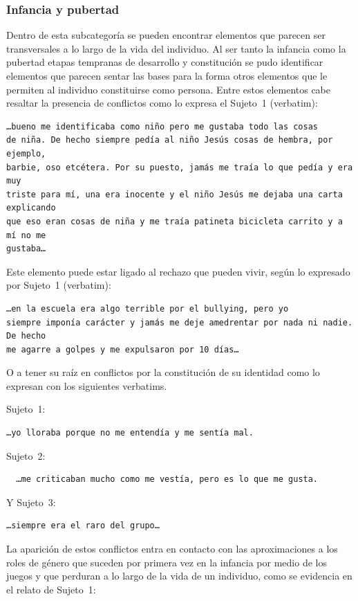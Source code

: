 \subsubsection{Infancia y pubertad}
Dentro de esta subcategoría se pueden
encontrar elementos que parecen ser transversales a lo largo de la vida del
individuo. Al ser tanto la infancia como la pubertad etapas tempranas de
desarrollo y constitución se pudo identificar elementos que parecen sentar las
bases para la forma otros elementos que le permiten al individuo constituirse
como persona. Entre estos elementos cabe resaltar la presencia de conflictos
como lo expresa el Sujeto~1 (verbatim):

\begin{verbatim}
…bueno me identificaba como niño pero me gustaba todo las cosas
de niña. De hecho siempre pedía al niño Jesús cosas de hembra, por ejemplo,
barbie, oso etcétera. Por su puesto, jamás me traía lo que pedía y era muy
triste para mí, una era inocente y el niño Jesús me dejaba una carta explicando
que eso eran cosas de niña y me traía patineta bicicleta carrito y a mí no me
gustaba…
\end{verbatim}

Este elemento puede estar ligado al rechazo que pueden vivir, según lo expresado
por Sujeto~1 (verbatim):

\begin{verbatim}
…en la escuela era algo terrible por el bullying, pero yo
siempre imponía carácter y jamás me deje amedrentar por nada ni nadie. De hecho
me agarre a golpes y me expulsaron por 10 días…
\end{verbatim}

O a tener su raíz en conflictos por la constitución de su identidad como lo
expresan con los siguientes verbatims.

Sujeto~1:
\begin{verbatim}
…yo lloraba porque no me entendía y me sentía mal.
\end{verbatim}

Sujeto~2:

\begin{verbatim}
  …me criticaban mucho como me vestía, pero es lo que me gusta.
\end{verbatim}

Y Sujeto~3:

\begin{verbatim}
…siempre era el raro del grupo…
\end{verbatim}

La aparición de estos conflictos entra en contacto con las aproximaciones a los
roles de género que suceden por primera vez en la infancia por medio de los
juegos y que perduran a lo largo de la vida de un individuo, como se evidencia
en el relato de Sujeto~1:


